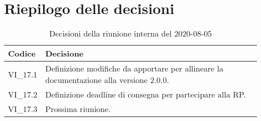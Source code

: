 \section{Riepilogo delle decisioni}
\begin{longtable}{ 
	 >{\centering}p{} >{}p{} }
	
	\caption{Decisioni della riunione interna del 2020-08-05}\\	
	
	\textbf{\color{white}Codice} & 
	\textbf{\color{white}Decisione} 
	\tabularnewline  
	\endhead
	
	VI\_17.1 & Definizione modifiche da apportare per allineare la documentazione alla versione 2.0.0. \\
	VI\_17.2 & Definizione deadline di consegna per partecipare alla RP. \\
	VI\_17.3 & Prossima riunione. \\
	

\end{longtable}